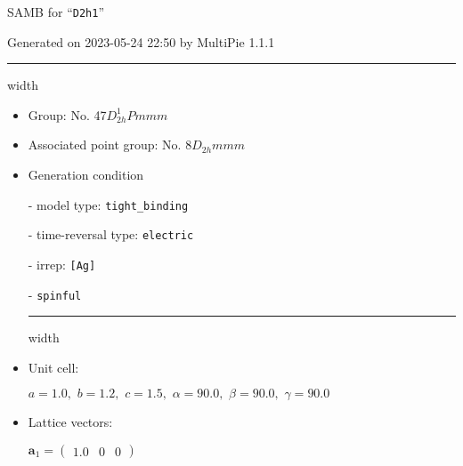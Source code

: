 \documentclass[fleqn,10pt,landscape]{article}
\begin{document}
\setcounter{MaxMatrixCols}{16}

\setlength{\baselineskip}{16pt}
\footnotesize
\begin{center}
\LARGE
SAMB for ``\texttt{D2h1}''
\end{center}
\begin{flushright}
Generated on 2023-05-24 22:50 by MultiPie 1.1.1
\end{flushright}
\vspace{1cm}


 \hfil \hrule height 1mm width \textwidth \hfil

\begin{itemize}
\item Group: No. 47\quad$D_{2h}^{1}$\quad$Pmmm$\quad[ orthorhombic ]

\item Associated point group: No. 8\quad$D_{2h}$\quad$mmm$\quad[ orthorhombic ]

\vspace{5mm}

\item Generation condition

\quad - model type: \texttt{tight_binding}

\quad - time-reversal type: \texttt{electric}

\quad - irrep: \texttt{[Ag]}

\quad - \texttt{spinful}


 \hfil \hrule height 1mm width \textwidth \hfil

\item Unit cell:

\quad $a=1.0,\,\, b=1.2,\,\, c=1.5,\,\, \alpha=90.0,\,\, \beta=90.0,\,\, \gamma=90.0$

\item Lattice vectors:

\quad $\bm{a}_1=\begin{pmatrix} 1.0 & 0 & 0 \end{pmatrix}$


\end{itemize}
\end{document}
